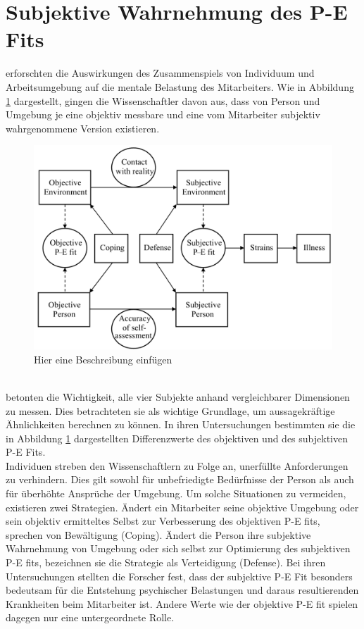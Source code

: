 \section{Subjektive Wahrnehmung des P-E Fits}
\label{ch:personEnvironmentFit:subjektivObjektiv}
\textcite{copingAndAdaption:1974} erforschten die Auswirkungen des Zusammenspiels von Individuum und Arbeitsumgebung auf die mentale Belastung des Mitarbeiters. Wie in Abbildung \ref{fig:personEnvironmentFit:subjektivObjektiv:abb1} dargestellt, gingen die Wissenschaftler davon aus, dass von Person und Umgebung je eine objektiv messbare und eine vom Mitarbeiter subjektiv wahrgenommene Version existieren. \\
\begin{figure}[h]
	\centering
	\includegraphics[width=1\textwidth]{gfx/subjektivObjektivPEFit.png}
	\caption{Hier eine Beschreibung einfügen \cite[S. 22]{edwards:2008}}
	\label{fig:personEnvironmentFit:subjektivObjektiv:abb1}
\end{figure}
\\
\textcite{copingAndAdaption:1974} betonten die Wichtigkeit, alle vier Subjekte anhand vergleichbarer Dimensionen zu messen. Dies betrachteten sie als wichtige Grundlage, um aussagekräftige Ähnlichkeiten berechnen zu können. In ihren Untersuchungen bestimmten sie die in Abbildung \ref{fig:personEnvironmentFit:subjektivObjektiv:abb1} dargestellten Differenzwerte des objektiven und des subjektiven P-E Fits.\\
Individuen streben den Wissenschaftlern zu Folge an, unerfüllte Anforderungen zu verhindern. Dies gilt sowohl für unbefriedigte Bedürfnisse der Person als auch für überhöhte Ansprüche der Umgebung. Um solche Situationen zu vermeiden, existieren zwei Strategien. Ändert ein Mitarbeiter seine objektive Umgebung oder sein objektiv ermitteltes Selbst zur Verbesserung des objektiven P-E fits, sprechen \textcite{copingAndAdaption:1974} von Bewältigung (Coping). Ändert die Person ihre subjektive Wahrnehmung von Umgebung oder sich selbst zur Optimierung des subjektiven P-E fits, bezeichnen sie die Strategie als Verteidigung (Defense). Bei ihren Untersuchungen stellten die Forscher fest, dass der subjektive P-E Fit besonders bedeutsam für die Entstehung psychischer Belastungen und daraus resultierenden Krankheiten beim Mitarbeiter ist. Andere Werte wie der objektive P-E fit spielen dagegen nur eine untergeordnete Rolle. \\
